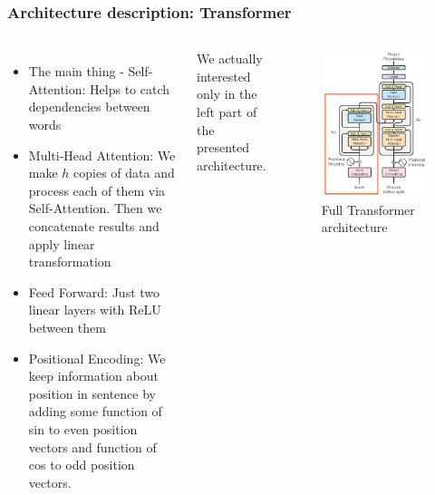 \documentclass[9pt]{beamer}%
\begin{document}
\begin{frame}
	\frametitle{Architecture description: Transformer}

\begin{columns}
	\begin{itemize}
		\item The main thing - Self-Attention: Helps to catch dependencies between words
		\item Multi-Head Attention: We make $h$ copies of data and process each of them via Self-Attention. Then we concatenate results and apply linear transformation
		\item Feed Forward: Just two linear layers with ReLU between them 
		\item Positional Encoding: We keep information about position in sentence by adding some function of sin to even position vectors and function of cos to odd position vectors.
	\end{itemize}
	We actually interested only in the left part of the presented architecture.
	\begin{figure}
		\includegraphics[scale=0.175]{Transformer}
		\caption{Full Transformer architecture}
	\end{figure}
\end{columns}
\end{frame}
\end{document}

